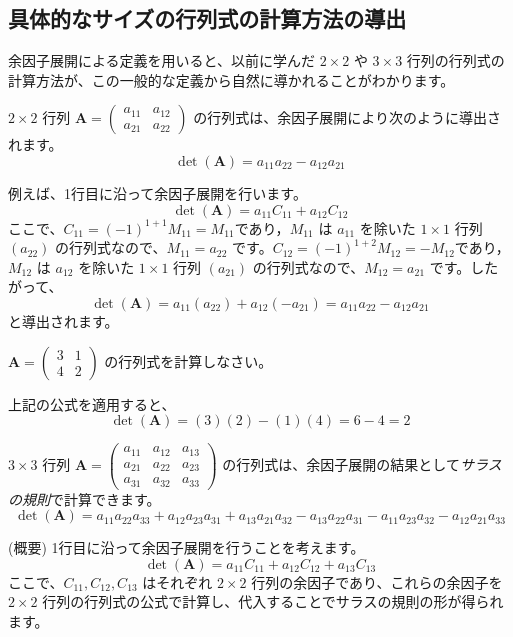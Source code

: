 \subsection{具体的なサイズの行列式の計算方法の導出}

余因子展開による定義を用いると、以前に学んだ $2 \times 2$ や $3 \times 3$ 行列の行列式の計算方法が、この一般的な定義から自然に導かれることがわかります。

\begin{thm} \label{determinant2}
$2 \times 2$ 行列 $\bm{A} = \begin{pmatrix} a_{11} & a_{12} \\ a_{21} & a_{22} \end{pmatrix}$ の行列式は、余因子展開により次のように導出されます。
\[ \det(\bm{A}) = a_{11}a_{22} - a_{12}a_{21} \]
\begin{proof*}
例えば、1行目に沿って余因子展開を行います。
\[ \det(\bm{A}) = a_{11}C_{11} + a_{12}C_{12} \]
ここで、$C_{11} = (-1)^{1+1}M_{11} = M_{11}$であり，$M_{11}$ は $a_{11}$ を除いた $1 \times 1$ 行列 $(a_{22})$ の行列式なので、$M_{11} = a_{22}$ です。$C_{12} = (-1)^{1+2}M_{12} = -M_{12}$であり，$M_{12}$ は $a_{12}$ を除いた $1 \times 1$ 行列 $(a_{21})$ の行列式なので、$M_{12} = a_{21}$ です。したがって、
\[ \det(\bm{A}) = a_{11}(a_{22}) + a_{12}(-a_{21}) = a_{11}a_{22} - a_{12}a_{21} \]
と導出されます。
\end{proof*}
\end{thm}

\begin{ex}
$\bm{A} = \begin{pmatrix} 3 & 1 \\ 4 & 2 \end{pmatrix}$ の行列式を計算しなさい。\par
上記の公式を適用すると、
\[ \det(\bm{A}) = (3)(2) - (1)(4) = 6 - 4 = 2 \]
\end{ex}

\begin{thm} \label{determinant3}
$3 \times 3$ 行列 $\bm{A} = \begin{pmatrix} a_{11} & a_{12} & a_{13} \\ a_{21} & a_{22} & a_{23} \\ a_{31} & a_{32} & a_{33} \end{pmatrix}$ の行列式は、余因子展開の結果として\emph{サラスの規則}で計算できます。
\[ \det(\bm{A}) = a_{11}a_{22}a_{33} + a_{12}a_{23}a_{31} + a_{13}a_{21}a_{32} - a_{13}a_{22}a_{31} - a_{11}a_{23}a_{32} - a_{12}a_{21}a_{33} \]
\begin{proof*} (概要)
1行目に沿って余因子展開を行うことを考えます。
\[ \det(\bm{A}) = a_{11}C_{11} + a_{12}C_{12} + a_{13}C_{13} \]
ここで、$C_{11}, C_{12}, C_{13}$ はそれぞれ $2 \times 2$ 行列の余因子であり、これらの余因子を $2 \times 2$ 行列の行列式の公式で計算し、代入することでサラスの規則の形が得られます。
\end{proof*}
\end{thm}

